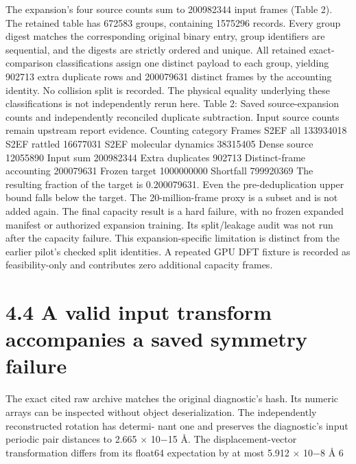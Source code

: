 \documentclass[11pt]{article}
\begin{document}
The expansion’s four source counts sum to 200982344 input frames (Table 2). The retained table has
672583 groups, containing 1575296 records. Every group digest matches the corresponding original
binary entry, group identifiers are sequential, and the digests are strictly ordered and unique. All
retained exact-comparison classifications assign one distinct payload to each group, yielding 902713
extra duplicate rows and 200079631 distinct frames by the accounting identity. No collision split is
recorded. The physical equality underlying these classifications is not independently rerun here.
Table 2: Saved source-expansion counts and independently reconciled duplicate subtraction. Input
source counts remain upstream report evidence.
Counting category Frames
S2EF all 133934018
S2EF rattled 16677031
S2EF molecular dynamics 38315405
Dense source 12055890
Input sum 200982344
Extra duplicates 902713
Distinct-frame accounting 200079631
Frozen target 1000000000
Shortfall 799920369
The resulting fraction of the target is 0.200079631. Even the pre-deduplication upper bound
falls below the target. The 20-million-frame proxy is a subset and is not added again. The final
capacity result is a hard failure, with no frozen expanded manifest or authorized expansion training.
Its split/leakage audit was not run after the capacity failure. This expansion-specific limitation is
distinct from the earlier pilot’s checked split identities. A repeated GPU DFT fixture is recorded
as feasibility-only and contributes zero additional capacity frames.

\section*{4.4 A valid input transform accompanies a saved symmetry failure}

The exact cited raw archive matches the original diagnostic’s hash. Its numeric arrays can be
inspected without object deserialization. The independently reconstructed rotation has determi-
nant one and preserves the diagnostic’s input periodic pair distances to 2.665 \ensuremath{\times} 10\ensuremath{-}15 Å. The
displacement-vector transformation differs from its float64 expectation by at most 5.912 \ensuremath{\times} 10\ensuremath{-}8 Å
6
\end{document}
